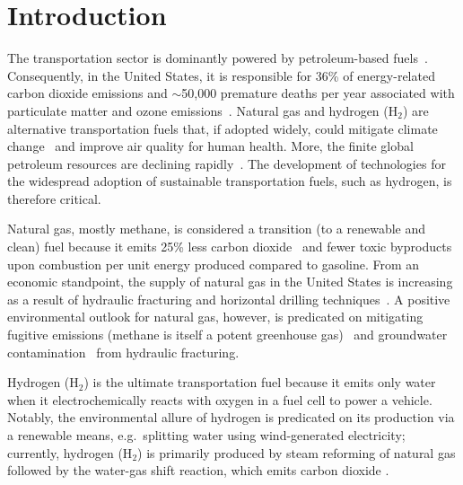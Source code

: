 \documentclass[pre,twocolumn]{revtex4-2}
\begin{document}
\maketitle



\section{Introduction}
The transportation sector is dominantly powered by petroleum-based
fuels~\cite{davis2009transportation}. 
Consequently, in the United States, it is responsible
for 36\% of energy-related carbon dioxide emissions \cite{useia} and $\sim$50,000
premature deaths per year associated with particulate matter and ozone
emissions~\cite{caiazzo2013air}. 
Natural gas and hydrogen (H$_2$) are
alternative transportation fuels that, if adopted widely,
could mitigate climate change~\cite{mcglade2015geographical} and improve air quality for human
health. 
More, the finite global petroleum resources are declining
rapidly~\cite{sorrell2010global}.
The development of technologies for the
widespread adoption of sustainable transportation fuels, such as hydrogen, is therefore
critical.

Natural gas, mostly methane, is considered a transition (to a renewable and
clean) fuel because it emits 25\% less carbon dioxide~\cite{eia2013much} and
fewer toxic byproducts~\cite{wang2000full} upon combustion per unit energy
produced compared to gasoline. From an economic standpoint, the supply of
natural gas in the United States is increasing as a result of hydraulic
fracturing and horizontal drilling techniques~\cite{usnatgassupply}. A positive
environmental outlook for natural gas, however, is predicated on mitigating
fugitive emissions (methane is itself a potent greenhouse
gas)~\cite{alvarez2012greater} and groundwater
contamination~\cite{osborn2011methane} from hydraulic fracturing.

Hydrogen (H$_2$) is the ultimate transportation fuel because it emits only
water when it electrochemically reacts with oxygen in a fuel cell to power a
vehicle. 
Notably, the environmental allure of hydrogen is predicated on its production 
via a renewable means, e.g.\ splitting water using wind-generated electricity;
currently, hydrogen (H$_2$) is primarily produced by steam reforming
of natural gas followed by the water-gas shift reaction, which emits carbon
dioxide \cite{crabtree2004hydrogen}. 
\end{document}
